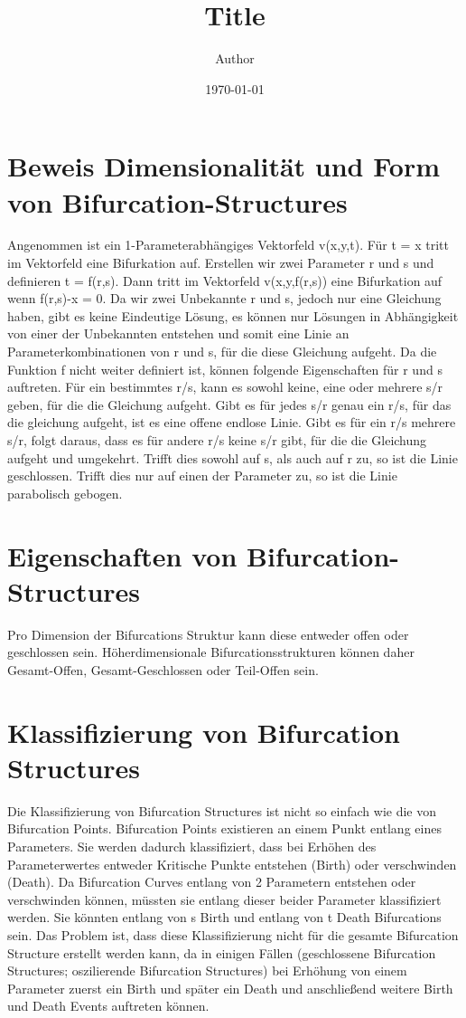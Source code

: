 \documentclass[11pt]{article}
\title{ Title}
\author{ Author }
\date{\today}
\begin{document}
\maketitle	
\pagebreak

\section{Beweis Dimensionalität und Form von Bifurcation-Structures}
Angenommen ist ein 1-Parameterabhängiges Vektorfeld v(x,y,t). Für t = x tritt im Vektorfeld eine Bifurkation auf.
Erstellen wir zwei Parameter r und s und definieren t = f(r,s). Dann tritt im Vektorfeld v(x,y,f(r,s)) eine Bifurkation auf wenn f(r,s)-x = 0. Da wir zwei Unbekannte r und s, jedoch nur eine Gleichung haben, gibt es keine Eindeutige Lösung, es können nur Lösungen in Abhängigkeit von einer der Unbekannten entstehen und somit eine Linie an Parameterkombinationen von r und s, für die diese Gleichung aufgeht.
Da die Funktion f nicht weiter definiert ist, können folgende Eigenschaften für r und s auftreten.
Für ein bestimmtes r/s, kann es sowohl keine, eine oder mehrere s/r geben, für die die Gleichung aufgeht.
Gibt es für jedes s/r genau ein r/s, für das die gleichung aufgeht, ist es eine offene endlose Linie.
Gibt es für ein r/s mehrere s/r, folgt daraus, dass es für andere r/s keine s/r gibt, für die die Gleichung aufgeht und umgekehrt. Trifft dies sowohl auf s, als auch auf r zu, so ist die Linie geschlossen. Trifft dies nur auf einen der Parameter zu, so ist die Linie parabolisch gebogen.

\section{Eigenschaften von Bifurcation-Structures}
Pro Dimension der Bifurcations Struktur kann diese entweder offen oder geschlossen sein.
Höherdimensionale Bifurcationsstrukturen können daher Gesamt-Offen, Gesamt-Geschlossen oder Teil-Offen sein.


\section{Klassifizierung von Bifurcation Structures}
Die Klassifizierung von Bifurcation Structures ist nicht so einfach wie die von Bifurcation Points.
Bifurcation Points existieren an einem Punkt entlang eines Parameters. Sie werden dadurch klassifiziert, dass bei Erhöhen des Parameterwertes entweder Kritische Punkte entstehen (Birth) oder verschwinden (Death).
Da Bifurcation Curves entlang von 2 Parametern entstehen oder verschwinden können, müssten sie entlang dieser beider Parameter klassifiziert werden.
Sie könnten entlang von s Birth und entlang von t Death Bifurcations sein.
Das Problem ist, dass diese Klassifizierung nicht für die gesamte Bifurcation Structure erstellt werden kann, da in einigen Fällen (geschlossene Bifurcation Structures; oszilierende Bifurcation Structures) bei Erhöhung von einem Parameter zuerst ein Birth und später ein Death und anschließend weitere Birth und Death Events auftreten können.
\end{document}
